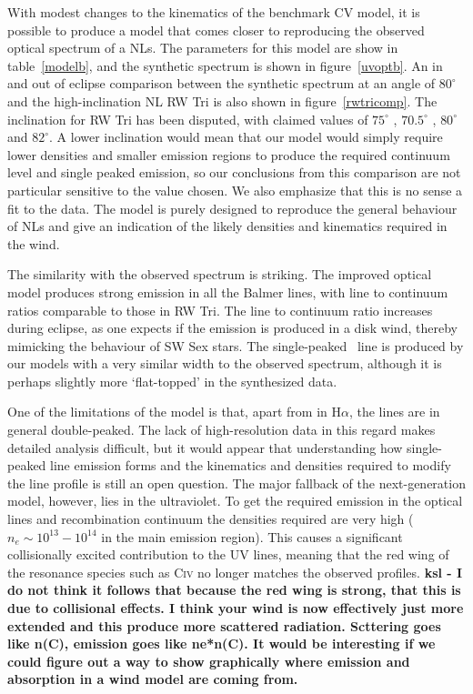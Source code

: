 \documentclass[preprint, a4paper, 11pt]{aastex}
\begin{document}
{With modest changes to the kinematics of the benchmark CV model,
it is possible to produce a model
that comes closer to reproducing the observed optical spectrum
of a NLs. The parameters for this model
are show in table~\ref{modelb}, and the synthetic spectrum
is shown in figure~\ref{uvoptb}. An in and out of eclipse comparison 
between the synthetic spectrum
at an angle of $80^\circ$ and the high-inclination NL RW Tri 
is also shown in figure~\ref{rwtricomp}. The inclination
for RW Tri has been disputed, with claimed values of $75^\circ$ \citep{groot2004},
$70.5^\circ$ \citep{smak1995}, $80^\circ$ \citep{longmore1981} and 
$82^\circ$\citep{frankking1981}. A lower inclination
would mean that our model would simply require lower densities 
and smaller emission regions to produce the required continuum level
and single peaked emission, so our conclusions from this comparison are
not particular sensitive to the value chosen.
We also emphasize that this is no sense a fit to the data. The model
is purely designed to reproduce the general behaviour of NLs
and give an indication of the likely densities and kinematics 
required in the wind.

The similarity with the observed spectrum is striking. 
The improved optical model produces strong emission in all the Balmer lines, 
with line to continuum ratios
comparable to those in RW Tri. 
The line to continuum ratio increases during eclipse,
as one expects if the emission is produced in a disk wind, 
thereby mimicking the behaviour of SW Sex stars.
The single-peaked \ha\ line is produced by our models with a 
very similar width to the observed spectrum, although it is perhaps slightly more
`flat-topped' in the synthesized data.

One of the limitations of the model is that, apart 
from in H$\alpha$, the lines are in general double-peaked. 
The lack of high-resolution data in this regard makes detailed analysis difficult,
but it would appear that understanding how single-peaked 
line emission forms and the kinematics and densities required to
modify the line profile is still an open question. 
The major fallback of the next-generation model, however, lies
in the ultraviolet. To get the required emission in the optical lines
and recombination continuum the densities required are very high 
($n_e\sim10^{13}-10^{14}$ in the main emission region).
This causes a significant collisionally excited contribution
to the UV lines, meaning that the red wing of the 
resonance species such as C\textsc{iv} no longer matches the
observed profiles. {\bf ksl - I do not think it follows that because the red wing is strong, that this is due to collisional effects.  I think your wind is now effectively just more extended and this produce more scattered radiation. Scttering goes like n(C), emission goes like ne*n(C).  It would be interesting if we could figure out a way to show graphically where emission and absorption in a wind model are coming from.}




}
\end{document}
